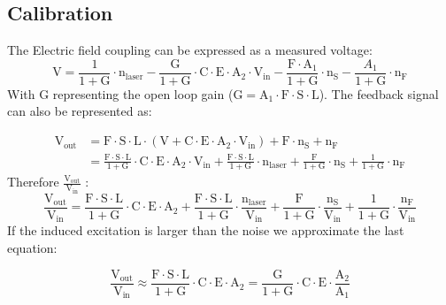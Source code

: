 \subsection{Calibration}



The  Electric field coupling can be expressed as a measured voltage:
$$\mathrm{V} = \frac{1}{1 + \mathrm{G}} \cdot \mathrm{n}_\mathrm{laser} - \frac{\mathrm{G}}{1 + \mathrm{G}} \cdot \mathrm{C}  \cdot \mathrm{E} \cdot \mathrm{A}_{2} \cdot \mathrm{V}_\mathrm{in} - \frac{\mathrm{F} \cdot \mathrm{A}_1}{1 + \mathrm{G}} \cdot \mathrm{n}_\mathrm{S} - \frac{A_1}{1 + \mathrm{G}} \cdot \mathrm{n}_\mathrm{F}$$
With G representing the open loop gain ($\mathrm{G} = \mathrm{A}_1 \cdot \mathrm{F} \cdot \mathrm{S} \cdot \mathrm{L}$). The feedback signal can also be represented as:

	\begin{align*} \mathrm{V}_\mathrm{out} & = \mathrm{F} \cdot \mathrm{S} \cdot \mathrm{L} \cdot (\mathrm{V} + \mathrm{C} \cdot \mathrm{E} \cdot \mathrm{A}_{2} \cdot \mathrm{V}_\mathrm{in}) + \mathrm{F} \cdot \mathrm{n}_\mathrm{S} + \mathrm{n}_\mathrm{F} \\ & = \frac{\mathrm{F} \cdot \mathrm{S} \cdot \mathrm{L}}{ 1 + \mathrm{G}} \cdot \mathrm{C} \cdot \mathrm{E} \cdot \mathrm{A}_{2} \cdot \mathrm{V}_\mathrm{in} + \frac{\mathrm{F} \cdot \mathrm{S} \cdot \mathrm{L}}{ 1 + \mathrm{G}} \cdot \mathrm{n}_\mathrm{laser} + \frac{\mathrm{F} }{ 1 + \mathrm{G}}\cdot \mathrm{n}_\mathrm{S} +  \frac{1}{ 1 + \mathrm{G}} \cdot \mathrm{n}_\mathrm{F} \end{align*}
Therefore $\frac{\mathrm{V}_\mathrm{out}}{\mathrm{V}_\mathrm{in}}$ : 
$$ \frac{\mathrm{V}_\mathrm{out}}{\mathrm{V}_\mathrm{in}} = \frac{\mathrm{F} \cdot \mathrm{S} \cdot \mathrm{L}}{1 + \mathrm{G}} \cdot \mathrm{C} \cdot \mathrm{E} \cdot \mathrm{A}_{2}  + \frac{\mathrm{F} \cdot \mathrm{S} \cdot \mathrm{L}}{ 1 + \mathrm{G}} \cdot \frac{\mathrm{n}_\mathrm{laser}}{\mathrm{V}_\mathrm{in}}+ \frac{\mathrm{F} }{ 1 + \mathrm{G}} \cdot \frac{\mathrm{n}_\mathrm{S}}{\mathrm{V}_\mathrm{in}} +  \frac{1}{ 1 + \mathrm{G}} \cdot \frac{\mathrm{n}_\mathrm{F}}{\mathrm{V}_\mathrm{in}}$$
If the induced excitation is larger than the noise  we approximate the last equation:

$$ \frac{\mathrm{V}_\mathrm{out}}{\mathrm{V_{in}}} \approx \frac{\mathrm{F} \cdot \mathrm{S} \cdot \mathrm{L}}{1 + \mathrm{G}} \cdot \mathrm{C} \cdot \mathrm{E} \cdot \mathrm{A}_{2} = \frac{\mathrm{G}}{1 + \mathrm{G}} \cdot \mathrm{C} \cdot \mathrm{E} \cdot \frac{\mathrm{A}_{2}}{\mathrm{A}_{1}} $$

